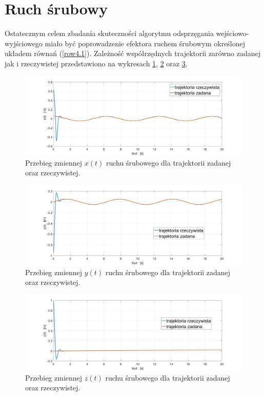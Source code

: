 \documentclass[eng,printmode]{mgr}
\begin{document}
\section{Ruch śrubowy}
Ostatecznym celem zbadania skuteczności algorytmu odsprzęgania wejściowo-wyjściowego miało być poprowadzenie efektora ruchem śrubowym określonej układem równań (\ref{row4.1}). Zależność współrzędnych trajektorii zarówno zadanej jak i rzeczywistej przedstawiono na wykresach \ref{srubx}, \ref{sruby} oraz \ref{srubz}.
\hfill \break
\begin{figure}[!h]
\centering
\includegraphics[width=1\textwidth]{srubx.jpg}
\caption{\label{srubx}Przebieg zmiennej $x(t)$ ruchu śrubowego dla trajektorii zadanej oraz rzeczywistej.}
\end{figure}
\begin{figure}[!h]
\centering
\includegraphics[width=1\textwidth]{sruby.jpg}
\caption{\label{sruby}Przebieg zmiennej $y(t)$ ruchu śrubowego dla trajektorii zadanej oraz rzeczywistej.}
\end{figure}
\begin{figure}[!h]
\centering
\includegraphics[width=1\textwidth]{srubz.jpg}
\caption{\label{srubz}Przebieg zmiennej $z(t)$ ruchu śrubowego dla trajektorii zadanej oraz rzeczywistej.}
\end{figure}
\end{document}
